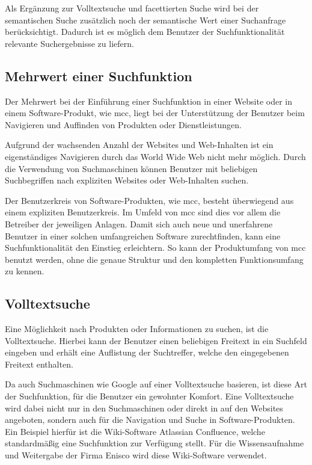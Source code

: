 Als Ergänzung zur Volltextsuche und facettierten Suche wird bei der semantischen Suche zusätzlich noch der semantische Wert einer Suchanfrage berücksichtigt. Dadurch ist es möglich dem Benutzer der Suchfunktionalität relevante Suchergebnisse zu liefern.

\subsection{Mehrwert einer Suchfunktion\label{subsec2.3.1:Unterunterpunkt-1}}

Der Mehrwert bei der Einführung einer Suchfunktion in einer Website oder in einem Software-Produkt, wie \gls{mcc}, liegt bei der Unterstützung der Benutzer beim Navigieren und Auffinden von Produkten oder Dienstleistungen.

Aufgrund der wachsenden Anzahl der Websites und Web-Inhalten \cite{GuyFawkes.2021} ist ein eigenständiges Navigieren durch das World Wide Web nicht mehr möglich. Durch die Verwendung von Suchmaschinen können Benutzer mit beliebigen Suchbegriffen nach expliziten Websites oder Web-Inhalten suchen.

Der Benutzerkreis von Software-Produkten, wie \gls{mcc}, besteht überwiegend aus einem expliziten Benutzerkreis. Im Umfeld von \gls{mcc} sind dies vor allem die Betreiber der jeweiligen Anlagen. Damit sich auch neue und unerfahrene Benutzer in einer solchen umfangreichen Software zurechtfinden, kann eine Suchfunktionalität den Einstieg erleichtern. So kann der Produktumfang von \gls{mcc} benutzt werden, ohne die genaue Struktur und den kompletten Funktionsumfang zu kennen.

\subsection{Volltextsuche\label{subsec2.3.2:Unterunterpunkt-2}}

Eine Möglichkeit nach Produkten oder Informationen zu suchen, ist die Volltextsuche. Hierbei kann der Benutzer einen beliebigen Freitext in ein Suchfeld eingeben und erhält eine Auflistung der Suchtreffer, welche den eingegebenen Freitext enthalten.

Da auch Suchmaschinen wie Google auf einer Volltextsuche basieren, ist diese Art der Suchfunktion, für die Benutzer ein gewohnter Komfort. Eine Volltextsuche wird dabei nicht nur in den Suchmaschinen oder direkt in auf den Websites angeboten, sondern auch für die Navigation und Suche in Software-Produkten. Ein Beispiel hierfür ist die Wiki-Software \glqq Atlassian Confluence\grqq{}, welche standardmäßig eine Suchfunktion zur Verfügung stellt. Für die Wissensaufnahme und Weitergabe der Firma Enisco wird diese Wiki-Software verwendet.

